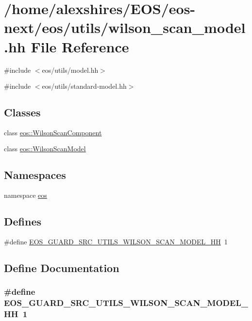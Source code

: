 \hypertarget{wilson__scan__model_8hh}{
\section{/home/alexshires/EOS/eos-\/next/eos/utils/wilson\_\-scan\_\-model.hh File Reference}
\label{wilson__scan__model_8hh}
}
{\ttfamily \#include $<$eos/utils/model.hh$>$}\par
{\ttfamily \#include $<$eos/utils/standard-\/model.hh$>$}\par
\subsection*{Classes}
\begin{DoxyCompactItemize}
\item 
class \hyperlink{classeos_1_1WilsonScanComponent}{eos::WilsonScanComponent}
\item 
class \hyperlink{classeos_1_1WilsonScanModel}{eos::WilsonScanModel}
\end{DoxyCompactItemize}
\subsection*{Namespaces}
\begin{DoxyCompactItemize}
\item 
namespace \hyperlink{namespaceeos}{eos}
\end{DoxyCompactItemize}
\subsection*{Defines}
\begin{DoxyCompactItemize}
\item 
\#define \hyperlink{wilson__scan__model_8hh_a30123afd38fa0d1cd5e4f0cf32e36bcd}{EOS\_\-GUARD\_\-SRC\_\-UTILS\_\-WILSON\_\-SCAN\_\-MODEL\_\-HH}~1
\end{DoxyCompactItemize}


\subsection{Define Documentation}
\hypertarget{wilson__scan__model_8hh_a30123afd38fa0d1cd5e4f0cf32e36bcd}{
\subsubsection[{EOS\_\-GUARD\_\-SRC\_\-UTILS\_\-WILSON\_\-SCAN\_\-MODEL\_\-HH}]{\setlength{\rightskip}{0pt plus 5cm}\#define EOS\_\-GUARD\_\-SRC\_\-UTILS\_\-WILSON\_\-SCAN\_\-MODEL\_\-HH~1}}
\label{wilson__scan__model_8hh_a30123afd38fa0d1cd5e4f0cf32e36bcd}
